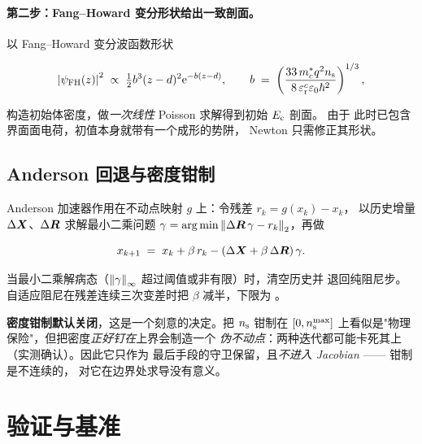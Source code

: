 \paragraph{第二步：Fang--Howard 变分形状给出一致剖面。}
以 Fang--Howard 变分波函数形状 \cite{fangHoward1966}

\begin{equation}
\left\lvert \psi_{\mathrm{FH}}(z) \right\rvert^{2} \;\propto\; \tfrac12 b^{3}(z-d)^{2}\mathrm{e}^{-b(z-d)},
\qquad
b \;=\; \left(\frac{33\,m^{*}_{c}q^{2}n_{\mathrm{s}}}{8\,\varepsilon_{\mathrm{r}}^{c}\varepsilon_{0}\hbar^{2}}\right)^{1/3},
\label{eq:fang-howard}
\end{equation}

构造初始体密度，做\emph{一次线性} Poisson 求解得到初始 $E_{\mathrm{c}}$ 剖面。
由于  此时已包含界面面电荷，初值本身就带有一个成形的势阱，
Newton 只需修正其形状。

\subsection{Anderson 回退与密度钳制}
\label{sec:sp1d-anderson}

Anderson 加速器作用在不动点映射 $g$ 上：令残差 $r_k = g(x_k)-x_k$，
以历史增量 $\Delta\bm{X}$、$\Delta\bm{R}$ 求解最小二乘问题
$\gamma = \operatorname*{arg\,min}\left\lVert \Delta\bm{R}\,\gamma - r_k \right\rVert_2$，再做

\begin{equation}
x_{k+1} \;=\; x_k + \beta\,r_k - \left(\Delta\bm{X}+\beta\,\Delta\bm{R}\right)\gamma .
\label{eq:anderson}
\end{equation}

当最小二乘解病态（$\left\lVert \gamma \right\rVert_\infty$ 超过阈值或非有限）时，清空历史并
退回纯阻尼步。自适应阻尼在残差连续三次变差时把 $\beta$ 减半，下限为
。

\textbf{密度钳制默认关闭}，这是一个刻意的决定。把 $n_{\mathrm{s}}$ 钳制在
$[0,n_{\mathrm{s}}^{\max}]$ 上看似是"物理保险"，但把密度\emph{正好钉在}上界会制造一个
\emph{伪不动点}：两种迭代都可能卡死其上（实测确认）。因此它只作为
最后手段的守卫保留，且\emph{不进入 Jacobian} —— 钳制是不连续的，
对它在边界处求导没有意义。

\section{验证与基准}
\label{sec:sp1d-verification}

